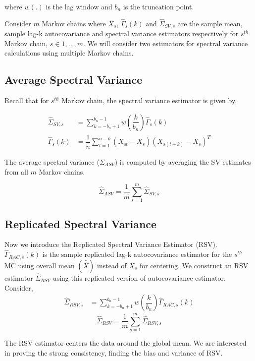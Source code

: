 \documentclass[11pt]{article}
\theoremstyle{remark}
\begin{document}
where $w(.)$ is the lag window and $b_n$ is the truncation point.

 Consider $m$ Markov chains where $\bar{X}_s$, $\hat{\Gamma}_s(k)$ and $\hat{\Sigma}_{SV, s}$ are the sample mean, sample lag-k autocovariance and spectral variance estimators respectively for $s^{th}$ Markov chain, $s\in {1,...,m}$. We will consider two estimators for spectral variance calculations using multiple Markov chains.

\subsection{Average Spectral Variance } \label{sec:asv}

Recall that for $s^{th}$ Markov chain, the spectral variance estimator is given by,

\begin{align*}
    \hat{\Sigma}_{SV,s} &= \sum_{k=-b_n+1}^{b_n-1}w\left(\dfrac{k}{b_n}\right)\hat{\Gamma}_s(k)\\
    \hat{\Gamma}_s(k) &= \dfrac{1}{n}\sum_{t=1}^{n-k}(X_{st}-\overline{X_s})(X_{s(t+k)}-\overline{X_s})^T
\end{align*}

The average spectral variance ($\Sigma_{ASV}$) is computed by averaging the SV estimates from all $m$ Markov chains.

\[
\hat{\Sigma}_{ASV} = \dfrac{1}{m}\sum_{s=1}^{m}\hat{\Sigma}_{SV,s}
\]

\subsection{Replicated Spectral Variance } \label{sec:rsv}

Now we introduce the Replicated Spectral Variance Estimator (RSV). $\hat{\Gamma}_{RAC,s}(k)$ is the sample replicated lag-k autocovariance estimator for the $s^{th}$ MC using overall mean $(\bar{\bar{X}})$ instead of $\bar{X}_s$ for centering. We construct an RSV estimator $\hat{\Sigma}_{RSV} $ using this replicated version of autocovariance estimator. Consider, 
%
\begin{align*}
    \hat{\Sigma}_{RSV,s} &= \sum_{k=-b_n+1}^{b_n-1}w\left(\dfrac{k}{b_n}\right)\hat{\Gamma}_{RAC,s}(k)
\end{align*}
\[
\hat{\Sigma}_{RSV} =  \dfrac{1}{m}\sum_{s=1}^{m}\hat{\Sigma}_{RSV,s}
\]

The RSV estimator centers the data around the global mean. We are interested in proving the strong consistency, finding the bias and variance of RSV. 
\end{document}
